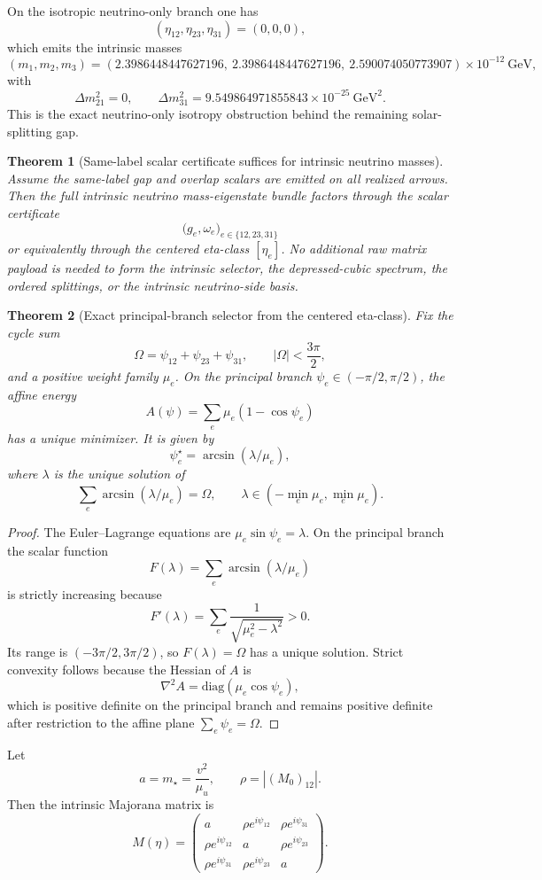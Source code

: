 \documentclass[11pt]{article}
\newtheorem{theorem}{Theorem}[section]
\begin{document}
On the isotropic neutrino-only branch one has
\[
(\eta_{12},\eta_{23},\eta_{31})=(0,0,0),
\]
which emits the intrinsic masses
\[
(m_1,m_2,m_3)=
(2.3986448447627196,\ 2.3986448447627196,\ 2.590074050773907)\times10^{-12}\ \mathrm{GeV},
\]
with
\[
\Delta m_{21}^2=0,
\qquad
\Delta m_{31}^2=9.549864971855843\times10^{-25}\ \mathrm{GeV}^2.
\]
This is the exact neutrino-only isotropy obstruction behind the remaining solar-splitting gap.

\begin{theorem}[Same-label scalar certificate suffices for intrinsic neutrino masses]
Assume the same-label gap and overlap scalars are emitted on all realized arrows. Then the full
intrinsic neutrino mass-eigenstate bundle factors through the scalar certificate
\[
\bigl(g_e,\omega_e\bigr)_{e\in\{12,23,31\}}
\]
or equivalently through the centered eta-class \([\eta_e]\). No additional raw matrix payload is
needed to form the intrinsic selector, the depressed-cubic spectrum, the ordered splittings, or
the intrinsic neutrino-side basis.
\end{theorem}

\begin{theorem}[Exact principal-branch selector from the centered eta-class]
Fix the cycle sum
\[
\Omega=\psi_{12}+\psi_{23}+\psi_{31},
\qquad |\Omega|<\frac{3\pi}{2},
\]
and a positive weight family \(\mu_e\). On the principal branch
\(\psi_e\in(-\pi/2,\pi/2)\), the affine energy
\[
A(\psi)=\sum_e \mu_e(1-\cos\psi_e)
\]
has a unique minimizer. It is given by
\[
\psi_e^\star=\arcsin(\lambda/\mu_e),
\]
where \(\lambda\) is the unique solution of
\[
\sum_e \arcsin(\lambda/\mu_e)=\Omega,
\qquad
\lambda\in(-\min_e\mu_e,\min_e\mu_e).
\]
\end{theorem}

\begin{proof}
The Euler--Lagrange equations are \(\mu_e\sin\psi_e=\lambda\). On the principal branch the scalar
function
\[
F(\lambda)=\sum_e\arcsin(\lambda/\mu_e)
\]
is strictly increasing because
\[
F'(\lambda)=\sum_e\frac{1}{\sqrt{\mu_e^2-\lambda^2}}>0.
\]
Its range is \((-3\pi/2,3\pi/2)\), so \(F(\lambda)=\Omega\) has a unique solution. Strict
convexity follows because the Hessian of \(A\) is
\[
\nabla^2A=\mathrm{diag}(\mu_e\cos\psi_e),
\]
which is positive definite on the principal branch and remains positive definite after
restriction to the affine plane \(\sum_e\psi_e=\Omega\).
\end{proof}

Let
\[
a=m_\star=\frac{v^2}{\mu_u},
\qquad
\rho = |(M_0)_{12}|.
\]
Then the intrinsic Majorana matrix is
\[
M(\eta)=
\begin{pmatrix}
a & \rho e^{i\psi_{12}} & \rho e^{i\psi_{31}}\\
\rho e^{i\psi_{12}} & a & \rho e^{i\psi_{23}}\\
\rho e^{i\psi_{31}} & \rho e^{i\psi_{23}} & a
\end{pmatrix}.
\]
\end{document}

